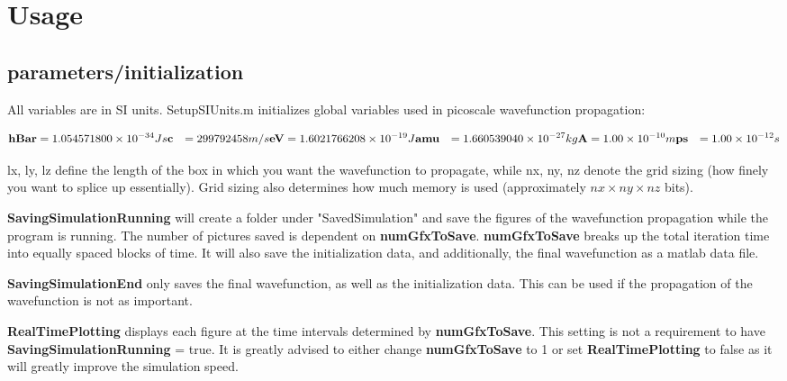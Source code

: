 \documentclass[11pt,letterpaper]{article}
\renewcommand{\\}{\bigskip}
\begin{document}
\section{Usage}

\subsection{parameters/initialization} 

All variables are in SI units. SetupSIUnits.m initializes global variables used in picoscale wavefunction propagation:

\begin{align*}
    \textbf{hBar} &= 1.054571800 \times 10^{-34} Js\\
    \textbf{c} &= 299792458 m/s\\
    \textbf{eV} &= 1.6021766208 \times 10^{-19} J\\
    \textbf{amu} &=  1.660539040 \times 10^{-27} kg\\
    \textbf{A} &= 1.00 \times 10^{-10} m\\
    \textbf{ps} &= 1.00 \times 10^{-12} s
\end{align*}

lx, ly, lz define the length of the box in which you want the wavefunction to propagate, while nx, ny, nz denote the grid sizing (how finely you want to splice up essentially). Grid sizing also determines how much memory is used (approximately $nx \times ny \times nz$ bits).\\

\textbf{SavingSimulationRunning} will create a folder under "SavedSimulation" and save the figures of the wavefunction propagation while the program is running. The number of pictures saved is dependent on \textbf{numGfxToSave}. \textbf{numGfxToSave} breaks up the total iteration time into equally spaced blocks of time. It will also save the initialization data, and additionally, the final wavefunction as a matlab data file.\\

\textbf{SavingSimulationEnd} only saves the final wavefunction, as well as the initialization data. This can be used if the propagation of the wavefunction is not as important.\\

\textbf{RealTimePlotting} displays each figure at the time intervals determined by \textbf{numGfxToSave}. This setting is not a requirement to have \textbf{SavingSimulationRunning} = true. It is greatly advised to either change \textbf{numGfxToSave} to 1 or set \textbf{RealTimePlotting} to false as it will greatly improve the simulation speed.\\
\end{document}
